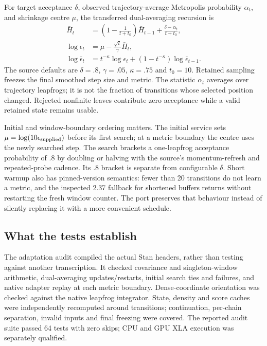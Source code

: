 For target acceptance $\delta$, observed trajectory-average Metropolis
probability $\alpha_t$, and shrinkage centre $\mu$, the transferred
dual-averaging recursion is
\begin{align}
 \bar H_t&=\left(1-\frac1{t+t_0}\right)\bar H_{t-1}
             +\frac{\delta-\alpha_t}{t+t_0},\label{eq:sw-dual-h}\\
 \log\epsilon_t&=\mu-\frac{\sqrt t}{\gamma}\bar H_t,\\
 \log\bar\epsilon_t&=t^{-\kappa}\log\epsilon_t
                   +(1-t^{-\kappa})\log\bar\epsilon_{t-1}.
\end{align}
The source defaults are $\delta=.8$, $\gamma=.05$, $\kappa=.75$ and
$t_0=10$. Retained sampling freezes the final smoothed step size and
metric. The statistic $\alpha_t$ averages over trajectory leapfrogs;
it is not the fraction of transitions whose selected position changed.
Rejected nonfinite leaves contribute zero acceptance while a valid retained
state remains usable.

Initial and window-boundary ordering matters. The initial service sets
$\mu=\log(10\epsilon_{\rm supplied})$ before its first search; at a
metric boundary the centre uses the newly searched step. The search
brackets a one-leapfrog acceptance probability of $.8$ by doubling or
halving with the source's momentum-refresh and repeated-probe cadence.
Its $.8$ bracket is separate from configurable $\delta$. Short warmup
also has pinned-version semantics: fewer than 20 transitions do not learn
a metric, and the inspected 2.37 fallback for shortened buffers returns
without restarting the fresh window counter. The port preserves that
behaviour instead of silently replacing it with a more convenient schedule.

\subsection{What the tests establish}

The adaptation audit compiled the actual Stan headers, rather than testing
against another transcription. It checked covariance and singleton-window
arithmetic, dual-averaging updates/restarts, initial search ties and failures,
and native adapter replay at each metric boundary. Dense-coordinate
orientation was checked against the native leapfrog integrator. State,
density and score caches were independently recomputed around transitions;
continuation, per-chain separation, invalid inputs and final freezing were
covered. The reported audit suite passed 64 tests with zero skips; CPU and
GPU XLA execution was separately qualified.

